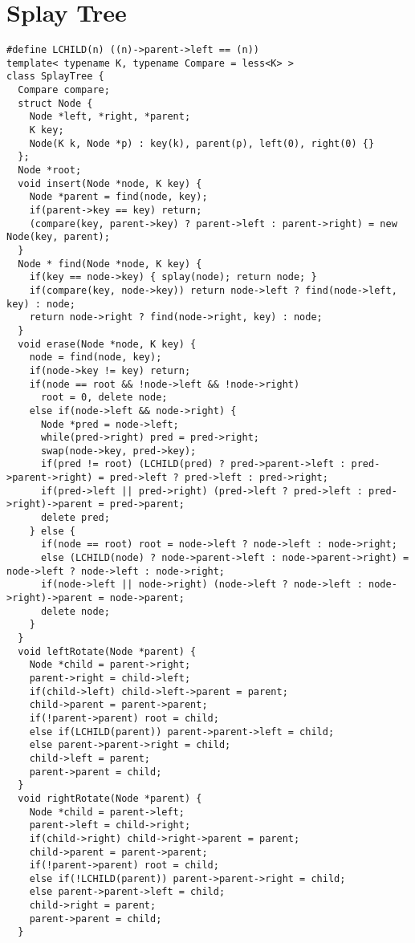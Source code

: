 \documentclass[11pt, oneside]{article}
\begin{document}
\section{Splay Tree}
\begin{lstlisting}
#define LCHILD(n) ((n)->parent->left == (n))
template< typename K, typename Compare = less<K> >
class SplayTree {
  Compare compare;
  struct Node {
    Node *left, *right, *parent;
    K key;
    Node(K k, Node *p) : key(k), parent(p), left(0), right(0) {}
  };
  Node *root;
  void insert(Node *node, K key) {
    Node *parent = find(node, key);
    if(parent->key == key) return;
    (compare(key, parent->key) ? parent->left : parent->right) = new Node(key, parent);
  }
  Node * find(Node *node, K key) {
    if(key == node->key) { splay(node); return node; }
    if(compare(key, node->key)) return node->left ? find(node->left, key) : node;
    return node->right ? find(node->right, key) : node;
  }
  void erase(Node *node, K key) {
    node = find(node, key);
    if(node->key != key) return;
    if(node == root && !node->left && !node->right)
      root = 0, delete node;
    else if(node->left && node->right) {
      Node *pred = node->left;
      while(pred->right) pred = pred->right;
      swap(node->key, pred->key);
      if(pred != root) (LCHILD(pred) ? pred->parent->left : pred->parent->right) = pred->left ? pred->left : pred->right;
      if(pred->left || pred->right) (pred->left ? pred->left : pred->right)->parent = pred->parent;
      delete pred;
    } else {
      if(node == root) root = node->left ? node->left : node->right;
      else (LCHILD(node) ? node->parent->left : node->parent->right) = node->left ? node->left : node->right;
      if(node->left || node->right) (node->left ? node->left : node->right)->parent = node->parent;
      delete node;
    }
  }
  void leftRotate(Node *parent) {
    Node *child = parent->right;
    parent->right = child->left;
    if(child->left) child->left->parent = parent;
    child->parent = parent->parent;
    if(!parent->parent) root = child;
    else if(LCHILD(parent)) parent->parent->left = child;
    else parent->parent->right = child;
    child->left = parent;
    parent->parent = child;
  }
  void rightRotate(Node *parent) {
    Node *child = parent->left;
    parent->left = child->right;
    if(child->right) child->right->parent = parent;
    child->parent = parent->parent;
    if(!parent->parent) root = child;
    else if(!LCHILD(parent)) parent->parent->right = child;
    else parent->parent->left = child;
    child->right = parent;
    parent->parent = child;
  }

\end{lstlisting}
\end{document}
